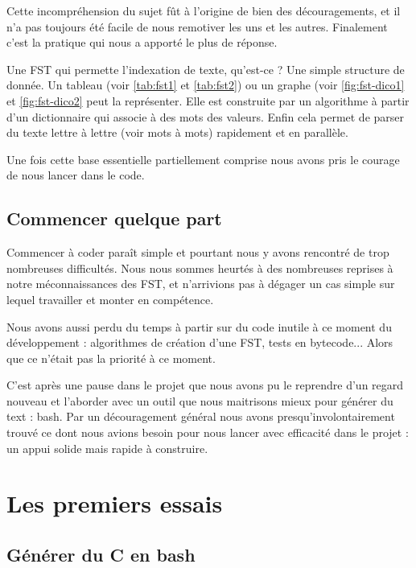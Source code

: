 Cette incompréhension du sujet fût à l'origine de bien des découragements, et il n'a pas toujours
été facile de nous remotiver les uns et les autres. Finalement c'est la pratique qui nous a apporté
le plus de réponse.\newline

Une FST qui permette l'indexation de texte, qu'est-ce ? Une simple structure de donnée. Un tableau
(voir \autoref{tab:fst1} et \autoref{tab:fst2}) ou un graphe (voir \autoref{fig:fst-dico1} et \autoref{fig:fst-dico2} peut la représenter.
Elle est construite par un algorithme à partir d'un dictionnaire qui associe à des mots des valeurs.
Enfin cela permet de parser du texte lettre à lettre (voir mots à mots) rapidement et en parallèle.


Une fois cette base essentielle partiellement comprise nous avons pris le courage de nous lancer
dans le code.

\subsection{Commencer quelque part}

Commencer à coder paraît simple et pourtant nous y avons rencontré de trop nombreuses difficultés.
Nous nous sommes heurtés à des nombreuses reprises à notre méconnaissances des FST, et n'arrivions
pas à dégager un cas simple sur lequel travailler et monter en compétence.

Nous avons aussi perdu du temps à partir sur du code inutile à ce moment du développement :
algorithmes de création d'une FST, tests en bytecode... Alors que ce n'était pas la priorité
à ce moment.\newline


C'est après une pause dans le projet que nous avons pu le reprendre d'un regard nouveau et
l'aborder avec un outil que nous maitrisons mieux pour générer du text : bash. Par un découragement
général nous avons presqu'involontairement trouvé ce dont nous avions besoin pour nous lancer
avec efficacité dans le projet : un appui solide mais rapide à construire.

\newpage
\section{Les premiers essais}

\subsection{Générer du C en bash}

